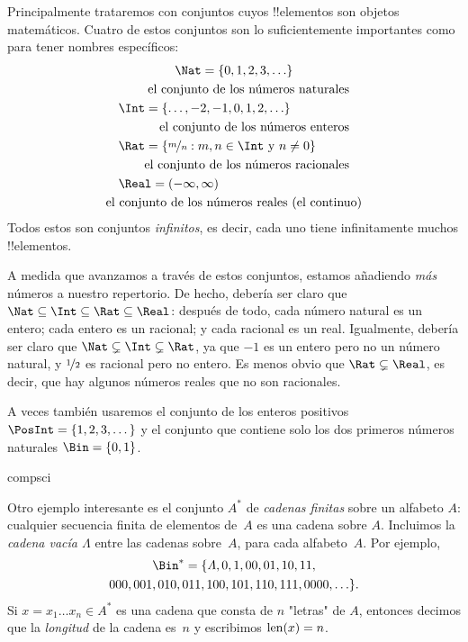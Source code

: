 \documentclass[../../../include/open-logic-section]{subfiles}
\begin{document}

\begin{ex}
Principalmente trataremos con conjuntos cuyos !!{elementos} son
objetos matemáticos. Cuatro de estos conjuntos son lo suficientemente
importantes como para tener nombres específicos:
\begin{multline*}
  \Nat = \{0, 1, 2, 3, \ldots\} \\
  \shoveright{\text{el conjunto de los números naturales}}\\
  \shoveleft{\Int = \{\ldots, -2, -1, 0, 1, 2, \ldots\}} \\
  \shoveright{\text{el conjunto de los números enteros}}\\
  \shoveleft{\Rat = \Setabs{\nicefrac{m}{n}}{m, n \in \Int\text{ y }n \neq 0}}\\
  \shoveright{\text{el conjunto de los números racionales}}\\
  \shoveleft{\Real = (-\infty, \infty)}\\
  \text{el conjunto de los números reales (el continuo)}
\end{multline*}
Todos estos son conjuntos \emph{infinitos}, es decir, cada uno tiene
infinitamente muchos !!{elementos}.

A medida que avanzamos a través de estos conjuntos, estamos añadiendo
\emph{más} números a nuestro repertorio. De hecho, debería ser claro que $\Nat \subseteq \Int
\subseteq \Rat \subseteq \Real$: después de todo, cada número natural es un
entero; cada entero es un racional; y cada racional es un real. Igualmente, debería ser claro que $\Nat \subsetneq \Int \subsetneq
\Rat$, ya que $-1$ es un entero pero no un número natural, y
$\nicefrac{1}{2}$ es racional pero no entero. Es menos obvio
que $\Rat \subsetneq \Real$, es decir, que hay algunos números reales que no son racionales.

A veces también usaremos el conjunto de los enteros positivos $\PosInt = \{1,
2, 3, \dots\}$ y el conjunto que contiene solo los dos primeros números naturales $\Bin = \{0, 1\}$.
\end{ex}

\begin{tagblock}{compsci}
\begin{ex}[Cadenas]
Otro ejemplo interesante es el conjunto $A^{*}$ de \emph{cadenas finitas} sobre un alfabeto $A$: cualquier secuencia finita de elementos de~$A$ es una cadena sobre $A$. Incluimos la \emph{cadena vacía $\Lambda$} entre las cadenas sobre~$A$, para cada alfabeto~$A$. Por ejemplo,
\begin{multline*}
\Bin^*
=\{\Lambda,0,1,00,01,10,11,\\
000,001,010,011,100,101,110,111,0000,\ldots\}.
\end{multline*}
Si $x=x_{1}\ldots x_{n}\in A^{*}$ es una cadena que consta de $n$
"letras" de $A$, entonces decimos que la \emph{longitud} de la cadena es~$n$ y escribimos $\mathrm{len}(x)=n$.
\end{ex}
\end{tagblock}
\end{document}
